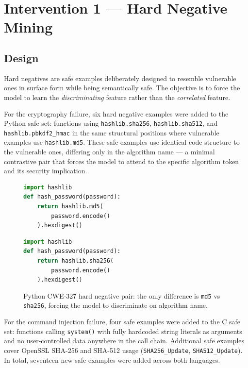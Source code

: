 \section{Intervention 1 --- Hard Negative Mining}

\subsection{Design}

Hard negatives are safe examples deliberately designed to resemble vulnerable ones in
surface form while being semantically safe.
The objective is to force the model to learn the \emph{discriminating} feature rather
than the \emph{correlated} feature.

For the cryptography failure, six hard negative examples were added to the Python safe set:
functions using \texttt{hashlib.sha256}, \texttt{hashlib.sha512}, and
\texttt{hashlib.pbkdf2\_hmac} in the same structural positions where vulnerable examples
use \texttt{hashlib.md5}.
These safe examples use identical code structure to the vulnerable ones, differing only in
the algorithm name --- a minimal contrastive pair that forces the model to attend to the
specific algorithm token and its security implication.

\begin{figure}[H]
\begin{minipage}[t]{0.48\textwidth}
\begin{lstlisting}[language=Python, caption={Vulnerable (CWE-327): \texttt{md5} used as password hash.}]
import hashlib
def hash_password(password):
    return hashlib.md5(
        password.encode()
    ).hexdigest()
\end{lstlisting}
\end{minipage}
\hfill
\begin{minipage}[t]{0.48\textwidth}
\begin{lstlisting}[language=Python, caption={Hard negative (safe): identical structure, secure algorithm.}]
import hashlib
def hash_password(password):
    return hashlib.sha256(
        password.encode()
    ).hexdigest()
\end{lstlisting}
\end{minipage}
\caption{Python CWE-327 hard negative pair: the only difference is \texttt{md5}
vs \texttt{sha256}, forcing the model to discriminate on algorithm name.}
\label{fig:hn_python}
\end{figure}

For the command injection failure, four safe examples were added to the C safe set:
functions calling \texttt{system()} with fully hardcoded string literals as arguments
and no user-controlled data anywhere in the call chain.
Additional safe examples cover OpenSSL SHA-256 and SHA-512 usage (\texttt{SHA256\_Update},
\texttt{SHA512\_Update}).
In total, seventeen new safe examples were added across both languages.


